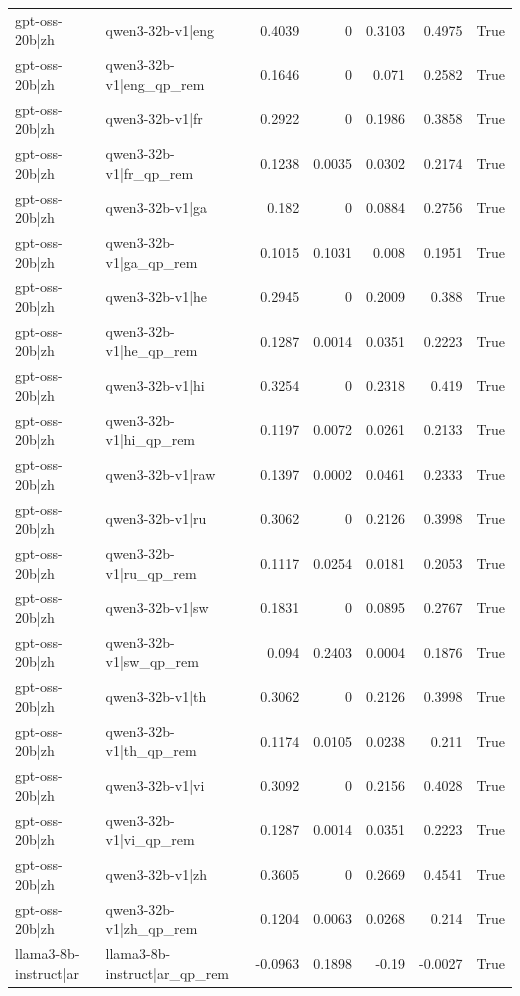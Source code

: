 \begin{table}
\begin{tabular}{l l r r r r l}
gpt-oss-20b|zh & qwen3-32b-v1|eng & 0.4039 & 0 & 0.3103 & 0.4975 & True \\
gpt-oss-20b|zh & qwen3-32b-v1|eng_qp_rem & 0.1646 & 0 & 0.071 & 0.2582 & True \\
gpt-oss-20b|zh & qwen3-32b-v1|fr & 0.2922 & 0 & 0.1986 & 0.3858 & True \\
gpt-oss-20b|zh & qwen3-32b-v1|fr_qp_rem & 0.1238 & 0.0035 & 0.0302 & 0.2174 & True \\
gpt-oss-20b|zh & qwen3-32b-v1|ga & 0.182 & 0 & 0.0884 & 0.2756 & True \\
gpt-oss-20b|zh & qwen3-32b-v1|ga_qp_rem & 0.1015 & 0.1031 & 0.008 & 0.1951 & True \\
gpt-oss-20b|zh & qwen3-32b-v1|he & 0.2945 & 0 & 0.2009 & 0.388 & True \\
gpt-oss-20b|zh & qwen3-32b-v1|he_qp_rem & 0.1287 & 0.0014 & 0.0351 & 0.2223 & True \\
gpt-oss-20b|zh & qwen3-32b-v1|hi & 0.3254 & 0 & 0.2318 & 0.419 & True \\
gpt-oss-20b|zh & qwen3-32b-v1|hi_qp_rem & 0.1197 & 0.0072 & 0.0261 & 0.2133 & True \\
gpt-oss-20b|zh & qwen3-32b-v1|raw & 0.1397 & 0.0002 & 0.0461 & 0.2333 & True \\
gpt-oss-20b|zh & qwen3-32b-v1|ru & 0.3062 & 0 & 0.2126 & 0.3998 & True \\
gpt-oss-20b|zh & qwen3-32b-v1|ru_qp_rem & 0.1117 & 0.0254 & 0.0181 & 0.2053 & True \\
gpt-oss-20b|zh & qwen3-32b-v1|sw & 0.1831 & 0 & 0.0895 & 0.2767 & True \\
gpt-oss-20b|zh & qwen3-32b-v1|sw_qp_rem & 0.094 & 0.2403 & 0.0004 & 0.1876 & True \\
gpt-oss-20b|zh & qwen3-32b-v1|th & 0.3062 & 0 & 0.2126 & 0.3998 & True \\
gpt-oss-20b|zh & qwen3-32b-v1|th_qp_rem & 0.1174 & 0.0105 & 0.0238 & 0.211 & True \\
gpt-oss-20b|zh & qwen3-32b-v1|vi & 0.3092 & 0 & 0.2156 & 0.4028 & True \\
gpt-oss-20b|zh & qwen3-32b-v1|vi_qp_rem & 0.1287 & 0.0014 & 0.0351 & 0.2223 & True \\
gpt-oss-20b|zh & qwen3-32b-v1|zh & 0.3605 & 0 & 0.2669 & 0.4541 & True \\
gpt-oss-20b|zh & qwen3-32b-v1|zh_qp_rem & 0.1204 & 0.0063 & 0.0268 & 0.214 & True \\
llama3-8b-instruct|ar & llama3-8b-instruct|ar_qp_rem & -0.0963 & 0.1898 & -0.19 & -0.0027 & True \\

\end{tabular}
\end{table}
